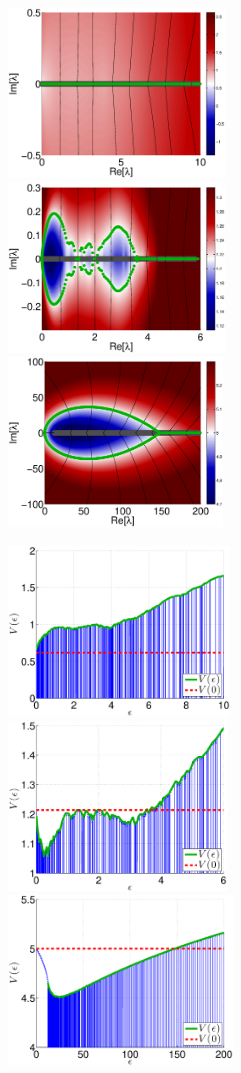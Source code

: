 \documentclass[aps,pre,floats,floatfix,twocolumn]{revtex4}
\begin{document}
\begin{figure}

\includegraphics[height=4.5cm]{spectrum_electrostatics1_2}
\includegraphics[height=4.5cm]{spectrum_electrostatics1}
\includegraphics[height=4.5cm]{spectrum_electrostatics2}

\includegraphics[height=4.5cm]{V_E_1_2b}
\includegraphics[height=4.5cm]{V_E_1b}
\includegraphics[height=4.5cm]{V_E_2b}


\end{figure}
\end{document}
